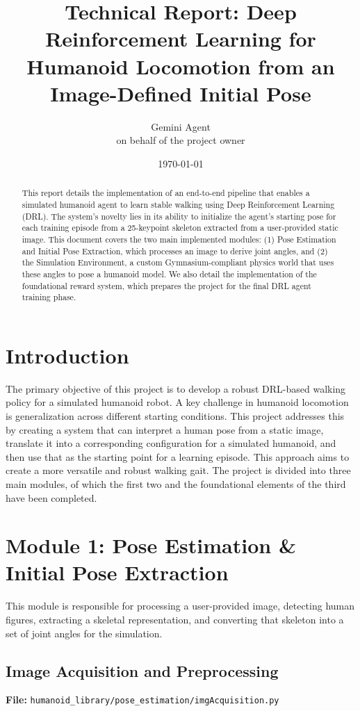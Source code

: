 \documentclass{article}
\title{Technical Report: Deep Reinforcement Learning for Humanoid Locomotion from an Image-Defined Initial Pose}
\author{Gemini Agent \\ on behalf of the project owner}
\date{\today}
\begin{document}
\maketitle

\begin{abstract}
This report details the implementation of an end-to-end pipeline that enables a simulated humanoid agent to learn stable walking using Deep Reinforcement Learning (DRL). The system's novelty lies in its ability to initialize the agent's starting pose for each training episode from a 25-keypoint skeleton extracted from a user-provided static image. This document covers the two main implemented modules: (1) Pose Estimation and Initial Pose Extraction, which processes an image to derive joint angles, and (2) the Simulation Environment, a custom Gymnasium-compliant physics world that uses these angles to pose a humanoid model. We also detail the implementation of the foundational reward system, which prepares the project for the final DRL agent training phase.
\end{abstract}

\section{Introduction}
The primary objective of this project is to develop a robust DRL-based walking policy for a simulated humanoid robot. A key challenge in humanoid locomotion is generalization across different starting conditions. This project addresses this by creating a system that can interpret a human pose from a static image, translate it into a corresponding configuration for a simulated humanoid, and then use that as the starting point for a learning episode. This approach aims to create a more versatile and robust walking gait. The project is divided into three main modules, of which the first two and the foundational elements of the third have been completed.

\section{Module 1: Pose Estimation & Initial Pose Extraction}
This module is responsible for processing a user-provided image, detecting human figures, extracting a skeletal representation, and converting that skeleton into a set of joint angles for the simulation.

\subsection{Image Acquisition and Preprocessing}
\textbf{File:} \texttt{humanoid_library/pose_estimation/imgAcquisition.py}
\end{document}
